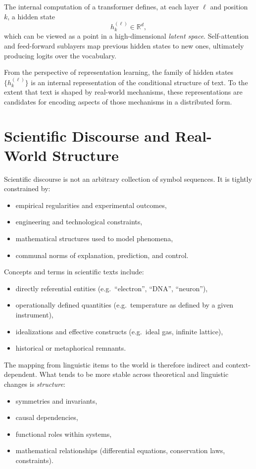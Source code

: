 \documentclass[11pt]{article}
\begin{document}
	The internal computation of a transformer defines, at each layer $\ell$ and position $k$, a hidden state
	\begin{equation}
		h^{(\ell)}_k \in \mathbb{R}^d,
	\end{equation}
	which can be viewed as a point in a high-dimensional \emph{latent space}. Self-attention and feed-forward sublayers map previous hidden states to new ones, ultimately producing logits over the vocabulary.
	
	From the perspective of representation learning, the family of hidden states $\{h^{(\ell)}_k\}$ is an internal representation of the conditional structure of text. To the extent that text is shaped by real-world mechanisms, these representations are candidates for encoding aspects of those mechanisms in a distributed form.
	
	\section{Scientific Discourse and Real-World Structure}
	
	Scientific discourse is not an arbitrary collection of symbol sequences. It is tightly constrained by:
	
	\begin{itemize}[nosep]
		\item empirical regularities and experimental outcomes,
		\item engineering and technological constraints,
		\item mathematical structures used to model phenomena,
		\item communal norms of explanation, prediction, and control.
	\end{itemize}
	
	Concepts and terms in scientific texts include:
	\begin{itemize}[nosep]
		\item directly referential entities (e.g.\ ``electron'', ``DNA'', ``neuron''),
		\item operationally defined quantities (e.g.\ temperature as defined by a given instrument),
		\item idealizations and effective constructs (e.g.\ ideal gas, infinite lattice),
		\item historical or metaphorical remnants.
	\end{itemize}
	
	The mapping from linguistic items to the world is therefore indirect and context-dependent. What tends to be more stable across theoretical and linguistic changes is \emph{structure}:
	\begin{itemize}[nosep]
		\item symmetries and invariants,
		\item causal dependencies,
		\item functional roles within systems,
		\item mathematical relationships (differential equations, conservation laws, constraints).
	\end{itemize}
	
\end{document}
